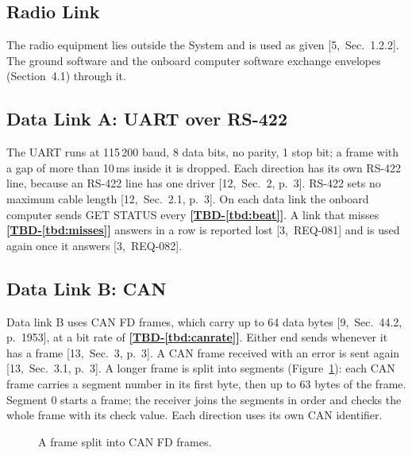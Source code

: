 \documentclass[11pt,a4paper]{article}
\newcommand{\tbd}[1]{\mbox{\textbf{[\hyperref[tbd:#1]{TBD-\ref*{tbd:#1}}]}}}
\begin{document}
\subsection{Radio Link}
The radio equipment lies outside the System and is used as given
[5,~Sec.~1.2.2]. The ground software and the onboard computer software
exchange envelopes (Section~4.1) through it.

\subsection{Data Link A: UART over RS-422}
\label{sec:linka}
The UART runs at 115\,200 baud, 8 data bits, no parity, 1 stop bit; a frame
with a gap of more than 10\,ms inside it is dropped. Each direction
has its own RS-422 line, because an RS-422 line has one driver
[12,~Sec.~2, p.~3]. RS-422 sets no maximum cable length [12,~Sec.~2.1, p.~3].
On each data link the onboard computer sends GET STATUS every \tbd{beat}. A
link that misses \tbd{misses} answers in a row is reported lost [3,~REQ-081]
and is used again once it answers [3,~REQ-082].

\subsection{Data Link B: CAN}
\label{sec:linkb}
Data link B uses CAN FD frames, which carry up to 64 data bytes
[9,~Sec.~44.2, p.~1953], at a bit rate of \tbd{canrate}. Either
end sends whenever it has a frame [13,~Sec.~3, p.~3]. A CAN frame received
with an error is sent again [13,~Sec.~3.1, p.~3]. A longer frame is split into segments
(Figure~\ref{fig:can}): each CAN frame carries a segment number in its first
byte, then up to 63 bytes of the frame. Segment 0 starts a frame; the receiver
joins the segments in order and checks the whole frame with its check value.
Each direction uses its own CAN identifier.

\begin{figure}[H]
\centering
{}
\caption{A frame split into CAN FD frames.}
\label{fig:can}
\end{figure}
\end{document}
